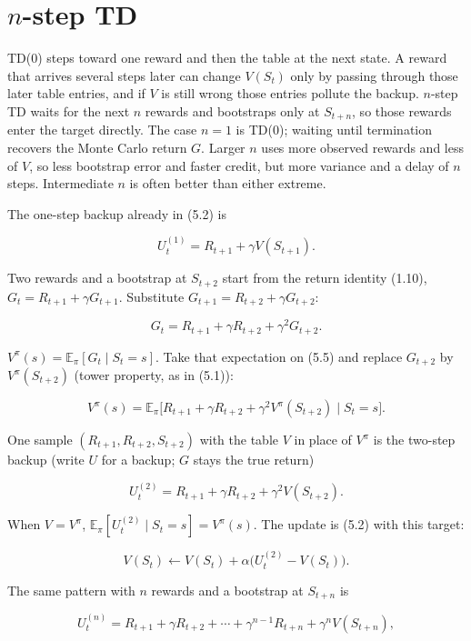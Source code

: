 


\section{$n$-step TD}

TD(0) steps toward one reward and then the table at the next state. A reward that arrives several steps later can change $V(S_t)$ only by passing through those later table entries, and if $V$ is still wrong those entries pollute the backup. $n$-step TD waits for the next $n$ rewards and bootstraps only at $S_{t+n}$, so those rewards enter the target directly. The case $n=1$ is TD(0); waiting until termination recovers the Monte Carlo return $G$. Larger $n$ uses more observed rewards and less of $V$, so less bootstrap error and faster credit, but more variance and a delay of $n$ steps. Intermediate $n$ is often better than either extreme.

The one-step backup already in (5.2) is

\[
U_t^{(1)}=R_{t+1}+\gamma V(S_{t+1}).
\]

Two rewards and a bootstrap at $S_{t+2}$ start from the return identity (1.10), $G_t=R_{t+1}+\gamma G_{t+1}$. Substitute $G_{t+1}=R_{t+2}+\gamma G_{t+2}$:

\begin{equation}
G_t=R_{t+1}+\gamma R_{t+2}+\gamma^2 G_{t+2}.
\tag{5.5}
\end{equation}

$V^\pi(s)=\mathbb{E}_\pi[G_t\mid S_t=s]$. Take that expectation on (5.5) and replace $G_{t+2}$ by $V^\pi(S_{t+2})$ (tower property, as in (5.1)):

\[
V^\pi(s)
=
\mathbb{E}_\pi\bigl[R_{t+1}+\gamma R_{t+2}+\gamma^2 V^\pi(S_{t+2})\mid S_t=s\bigr].
\]

One sample $(R_{t+1},R_{t+2},S_{t+2})$ with the table $V$ in place of $V^\pi$ is the two-step backup (write $U$ for a backup; $G$ stays the true return)

\[
U_t^{(2)}=R_{t+1}+\gamma R_{t+2}+\gamma^2 V(S_{t+2}).
\]

When $V=V^\pi$, $\mathbb{E}_\pi[U_t^{(2)}\mid S_t=s]=V^\pi(s)$. The update is (5.2) with this target:

\[
V(S_t)\leftarrow V(S_t)+\alpha\bigl(U_t^{(2)}-V(S_t)\bigr).
\]

The same pattern with $n$ rewards and a bootstrap at $S_{t+n}$ is

\[
U_t^{(n)}=R_{t+1}+\gamma R_{t+2}+\cdots+\gamma^{n-1}R_{t+n}+\gamma^n V(S_{t+n}),
\]

